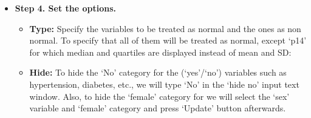 \documentclass[11pt]{article}
\begin{document}
\begin{itemize}
\newpage
\item {\bf Step 4. Set the options.}

	\begin{itemize}
	
	\item {\bf Type:} Specify the variables to be treated as normal and the ones as non normal. To specify that all of them will be treated as normal, except `p14' for which median and quartiles are displayed instead of mean and SD:
\begin{center}
\end{center}	

    \vspace{0.5cm}
	\item {\bf Hide:} To hide the `No' category for the (`yes'/`no') variables such as hypertension, diabetes, etc., we will type `No' in the `hide no' input text window. Also, to hide the `female' category for we will select the `sex' variable and `female' category and press `Update' button afterwards.
\begin{center}
\end{center}	


\end{itemize}
\end{itemize}
\end{document}
